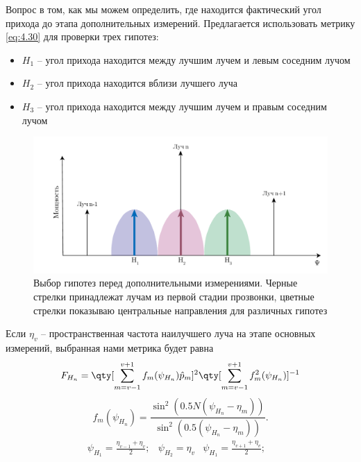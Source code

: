 Вопрос в том, как мы можем определить, где находится фактический угол прихода до этапа дополнительных измерений.
Предлагается использовать метрику \eqref{eq:4.30} для проверки трех гипотез:
\begin{itemize}
    \item $H_1$ -- угол прихода находится между лучшим лучем и левым соседним лучом
    \item $H_2$ -- угол прихода находится вблизи лучшего луча
    \item $H_3$ -- угол прихода находится между лучшим лучем и правым соседним лучом
\end{itemize}

\begin{figure}[ht]
    \centering
    \includegraphics[width=0.75\linewidth]{figs/fig4.13}
    \caption{Выбор гипотез перед дополнительными измерениями. Черные стрелки принадлежат лучам из первой стадии прозвонки, цветные стрелки показываю центральные направления для различных гипотез}
    \label{fig:4.13}
\end{figure}

Если $\eta_v$ --  пространственная частота наилучшего луча на этапе основных измерений, выбранная нами метрика будет равна
\begin{equation}
    \label{eq:4.34}
    F_{H_n} = \qty[\sum\limits_{m=v-1}^{v+1} f_m (\psi_{H_n}) \hat p_m]^2 \qty[\sum\limits_{m=v-1}^{v+1}f_m^2(\psi_{H_n})]^{-1}
\end{equation}
\begin{equation}
    \label{eq:4.35}
    f_m(\psi_{H_n}) = \frac{\sin^2 (0.5N(\psi_{H_n} - \eta_{m}))}{\sin^2(0.5(\psi_{H_n} - \eta_{m}))}.
\end{equation}
\begin{equation}
    \label{eq:4.36}
    \begin{matrix}
        \psi_{H_1} = \frac{\eta_{v-1} + \eta_v}{2}; &
        \psi_{H_2} = \eta_{v}                       &
        \psi_{H_1} = \frac{\eta_{v+1} + \eta_v}{2}; &
    \end{matrix}
\end{equation}


